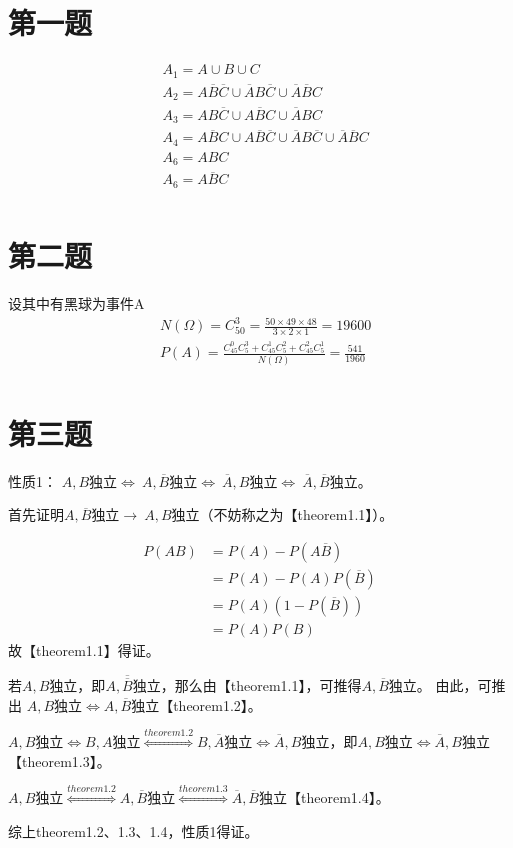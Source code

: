 \documentclass{article}
\date{\today}
\newcommand{\twooverline}[1]{\overline{\overline{#1}}}
\begin{document}
\makecover
\section*{第一题}
\begin{align*}
&A_1=A\cup B \cup C\\
&A_2=A \overline B\overline C \cup \overline A B \overline C \cup \overline A\overline B C\\
&A_3=AB\overline C \cup A\overline B C \cup \overline ABC\\
&A_4=\overline{ABC}\cup A \overline B\overline C \cup \overline A B \overline C \cup \overline A\overline B C\\
&A_6=ABC\\
&A_6=\overline{ABC}\\	
\end{align*}
\section*{第二题}
设其中有黑球为事件A\\
\begin{align*}
&N(\Omega)=C_{50}^{3}=\frac{50\times49\times48}{3\times2\times1}=19600\\
&P(A)=\frac{C_{45}^0C_{5}^3 + C_{45}^1C_{5}^2 + C_{45}^2C_{5}^1}{N(\Omega)}=\frac{541}{1960}\\
\end{align*}
\section*{第三题}
性质1： $A,B$独立$\iff\ A,\overline B$独立$\iff\ \overline A,B$独立$\iff\ \overline A,\overline B$独立。

首先证明$A,\overline B$独立$\rightarrow\ A,B$独立（不妨称之为【theorem1.1】）。

\begin{align*}
P(AB)&=P(A)-P(A\overline B)\\
&=P(A)-P(A)P(\overline B)\\
&=P(A)(1-P(\overline B))\\
&=P(A)P(B)
\end{align*}
故【theorem1.1】得证。

若$A,B$独立，即$A,\twooverline {B}$独立，那么由【theorem1.1】，可推得$A,\overline {B}$独立。
由此，可推出
$A,B$独立$\Leftrightarrow A,\overline B$独立【theorem1.2】。

$A,B$独立$\Leftrightarrow B,A$独立$\stackrel{theorem1.2}\Longleftrightarrow B,\overline A$独立$\Leftrightarrow \overline A,  B$独立，即$A,B$独立$\Leftrightarrow \overline A,  B$独立【theorem1.3】。

$A,B$独立$\stackrel{theorem1.2}\Longleftrightarrow A,\overline B$独立$\stackrel{theorem1.3}\Longleftrightarrow \overline A,\overline B$独立【theorem1.4】。

综上theorem1.2、1.3、1.4，性质1得证。
\end{document}
